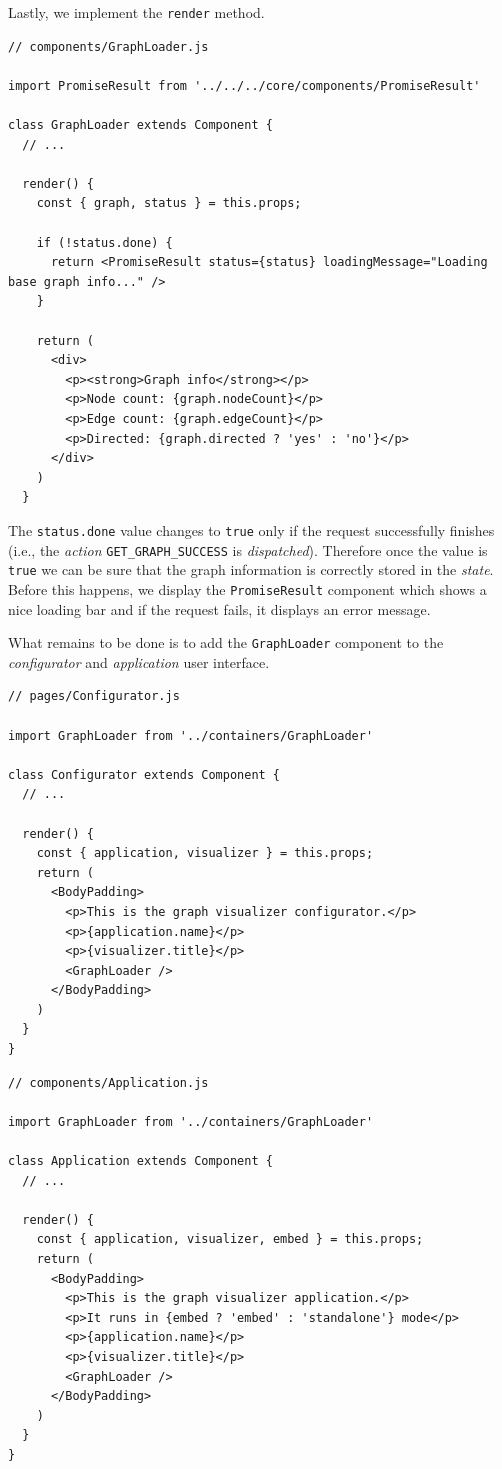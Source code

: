Lastly, we implement the \texttt{render} method.

\begin{verbatim}
// components/GraphLoader.js

import PromiseResult from '../../../core/components/PromiseResult'

class GraphLoader extends Component {
  // ...
  
  render() {
    const { graph, status } = this.props;

    if (!status.done) {
      return <PromiseResult status={status} loadingMessage="Loading base graph info..." />
    }

    return (
      <div>
        <p><strong>Graph info</strong></p>
        <p>Node count: {graph.nodeCount}</p>
        <p>Edge count: {graph.edgeCount}</p>
        <p>Directed: {graph.directed ? 'yes' : 'no'}</p>
      </div>
    )
  }
\end{verbatim}

The \texttt{status.done} value changes to \texttt{true} only if the request successfully finishes (i.e., the \emph{action} \texttt{GET\_GRAPH\_SUCCESS} is \emph{dispatched}). Therefore once the value is \texttt{true} we can be sure that the graph information is correctly stored in the \emph{state}. Before this happens, we display the \texttt{PromiseResult} component which shows a nice loading bar and if the request fails, it displays an error message. 

What remains to be done is to add the \texttt{GraphLoader} component to the \emph{configurator} and \emph{application} user interface.

\begin{verbatim}
// pages/Configurator.js

import GraphLoader from '../containers/GraphLoader'

class Configurator extends Component {
  // ...

  render() {
    const { application, visualizer } = this.props;
    return (
      <BodyPadding>
        <p>This is the graph visualizer configurator.</p>
        <p>{application.name}</p>
        <p>{visualizer.title}</p>
        <GraphLoader />
      </BodyPadding>
    )
  }
}
\end{verbatim}

\begin{verbatim}
// components/Application.js

import GraphLoader from '../containers/GraphLoader'

class Application extends Component {
  // ...

  render() {
    const { application, visualizer, embed } = this.props;
    return (
      <BodyPadding>
        <p>This is the graph visualizer application.</p>
        <p>It runs in {embed ? 'embed' : 'standalone'} mode</p>
        <p>{application.name}</p>
        <p>{visualizer.title}</p>
        <GraphLoader />
      </BodyPadding>
    )
  }
}
\end{verbatim}

